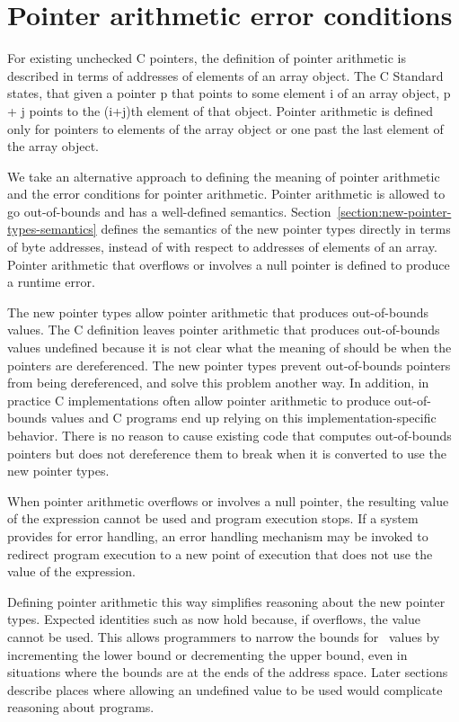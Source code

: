 \section{Pointer arithmetic error conditions}
\label{section:pointer-arithmetic-errors}

For existing unchecked C pointers, the definition of pointer arithmetic is
described in terms of addresses of elements of an array object. The C
Standard \cite{ISO2011} states, that given a pointer p that points to some element i of
an array object, p + j points to the (i+j)th element of that object.
Pointer arithmetic is defined only for pointers to elements of the array
object or one past the last element of the array object.

We take an alternative approach to defining the meaning of pointer
arithmetic and the error conditions for pointer arithmetic. Pointer
arithmetic is allowed to go out-of-bounds and has a well-defined
semantics. Section~\ref{section:new-pointer-types-semantics}
defines the semantics of the new pointer types
directly in terms of byte addresses, instead of with respect to
addresses of elements of an array. Pointer arithmetic that overflows or
involves a null pointer is defined to produce a runtime error.

The new pointer types allow pointer arithmetic that produces
out-of-bounds values. The C definition leaves pointer arithmetic that
produces out-of-bounds values undefined because it is not clear what the
meaning of should be when the pointers are dereferenced. The new pointer
types prevent out-of-bounds pointers from being dereferenced, and solve
this problem another way. In addition, in practice C implementations
often allow pointer arithmetic to produce out-of-bounds values and C
programs end up relying on this implementation-specific behavior. There
is no reason to cause existing code that computes out-of-bounds pointers
but does not dereference them to break when it is converted to use the
new pointer types.

When pointer arithmetic overflows or involves a null pointer, the
resulting value of the expression cannot be used and program execution
stops. If a system provides for error handling, an error handling
mechanism may be invoked to redirect program execution to a new point of
execution that does not use the value of the expression.

Defining pointer arithmetic this way simplifies reasoning about the new
pointer types. Expected identities such as  now hold
because, if  overflows, the value cannot be
used. This allows programmers to narrow the bounds for
\arrayptr\ values by incrementing the lower bound or
decrementing the upper bound, even in situations where the bounds are at
the ends of the address space. Later sections describe places where
allowing an undefined value to be used would complicate reasoning about
programs.

